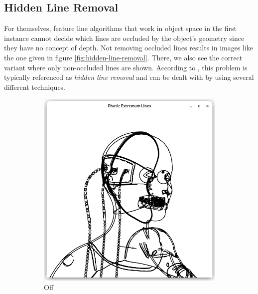 \documentclass[9pt,fleqn,twoside,twocolumn]{stdglobal}
\begin{document}
  \subsection{Hidden Line Removal}
    For themselves, feature line algorithms that work in object space in the first instance cannot decide which lines are occluded by the object's geometry since they have no concept of depth.
    Not removing occluded lines results in images like the one given in figure \ref{fig:hidden-line-removal}.
    There, we also see the correct variant where only non-occluded lines are shown.
    According to \textcite{isenberg2003}, this problem is typically referenced as \textit{hidden line removal} and can be dealt with by using several different techniques.

    \begin{figure}[h]
      \centering
      \begin{subfigure}[b]{0.49\linewidth}
        \centering
        \includegraphics[width=\textwidth,trim={15px 15 15 50},clip]{images/cyborg-contour-pel-hidden-shader.png}
        \caption{Off}
      \end{subfigure}
      \begin{subfigure}[b]{0.49\linewidth}
        \centering

\end{subfigure}
\end{figure}
\end{document}
